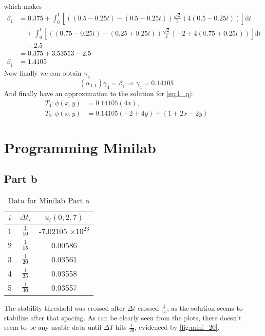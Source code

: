 \documentclass[12pt]{article}
\newcommand{\dd}[1]{\mathrm{d}{#1}}
\begin{document}
which makes 
\begin{equation}
  \label{eq:1_beta_para}
  \begin{aligned}
    \beta_1&= 0.375 +
    \int_0^1\left[((0.5-0.25t)-(0.5-0.25t))\frac{\sqrt{2}}{2}(4(0.5-0.25t))\right]\dd{t} 
    \\ &\quad+
    \int_0^1\left[((0.75-0.25t)-(0.25+0.25t))\frac{\sqrt{2}}{2}(-2+4(0.75+0.25t))\right]\dd{t}
    \\ &\quad- 2.5\\
    &= 0.375 + 3.53553 - 2.5 \\
    \beta_1 &= 1.4105
  \end{aligned}
\end{equation}
Now finally we can obtain $\gamma_4$ 
\begin{equation}
  \label{eq:1_gamma_4}
  (\alpha_{1,1})\gamma_4 = \beta_1 \Rightarrow \gamma_4 = 0.14105
\end{equation}
And finally have an approximation to the solution for \cref{eq:1_q}:
\begin{equation}
  \label{eq:1_approx_t_phi}
  \boxed{
    \begin{aligned}
      T_1:\phi(x,y)&=0.14105(4x), \\
      T_2:\phi(x,y)&=0.14105(-2+4y)+(1+2x-2y)
    \end{aligned}
  }
\end{equation}

\section{Programming Minilab}
\subsection{Part b}
\begin{table}[H]
  \centering
  \begin{tabular}[H]{ccc}
    \hline
    $i$ & $\Delta t_i$ & $u_i(0,2,7)$ \\
    \hline
    1 & $\frac{1}{10}$ & -7.02105 $\times 10^{23}$ \\
    2 & $\frac{1}{15}$ & 0.00586 \\
    3 & $\frac{1}{20}$ & 0.03561 \\
    4 & $\frac{1}{25}$ & 0.03558 \\
    5 & $\frac{1}{30}$ & 0.03557 \\
    \hline
  \end{tabular}
  \caption{Data for Minilab Part a}
  \label{tab:mini_b}
\end{table}
The stability threshold was crossed after $\Delta t$ crossed
$\frac{1}{15}$, as the solution seems to stabilize after that
spacing. As can be clearly seen from the plots, there doesn't seem to
be any usable data until $\Delta T$ hits $\frac{1}{20}$, evidenced by
\cref{fig:mini_20}. 
\end{document}
